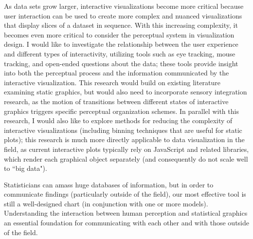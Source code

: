 \documentclass[11pt,letterpaper,sans,unicode]{moderncv}        %
\begin{document}
\vspace{.65cm}\hspace{8pt} As data sets grow larger, interactive visualizations become more critical because user interaction can be used to create more complex and nuanced visualizations that display slices of a dataset in sequence. With this increasing complexity, it becomes even more critical to consider the perceptual system in visualization design. I would like to investigate the relationship between the user experience and different types of interactivity, utilizing tools such as eye tracking, mouse tracking, and open-ended questions about the data; these tools provide insight into both the perceptual process and the information communicated by the interactive visualization. This research would build on existing literature examining static graphics, but would also need to incorporate sensory integration research, as the motion of transitions between different states of interactive graphics triggers specific perceptual organization schemes. In parallel with this research, I would also like to explore methods for reducing the complexity of interactive visualizations (including binning techniques that are useful for static plots); this research is much more directly applicable to data visualization in the field, as current interactive plots typically rely on JavaScript and related libraries, which render each graphical object separately (and consequently do not scale well to ``big data"). 


Statisticians can amass huge databases of information, but in order to communicate findings (particularly outside of the field), our most effective tool is still a well-designed chart (in conjunction with one or more models). Understanding the interaction between human perception and statistical graphics an essential foundation for communicating with each other and with those outside of the field. 
\end{document}
